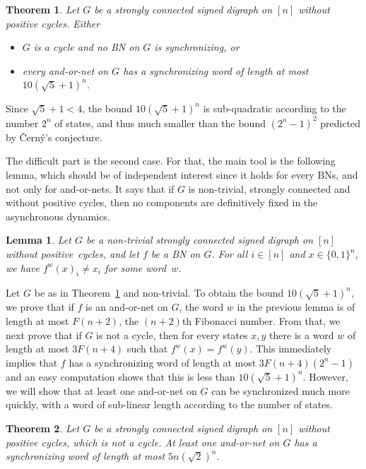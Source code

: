 \documentclass[11pt,letter]{article}
\newtheorem{lemma}{Lemma}
\newtheorem{theorem}{Theorem}
\newcommand{\B}{\{0,1\}}
\begin{document}

\begin{theorem}\label{thm:main}
Let $G$ be a strongly connected signed digraph on $[n]$ without positive cycles. Either
\begin{itemize}
\item $G$ is a cycle and no BN on $G$ is synchronizing, or
\item every and-or-net on $G$ has a synchronizing word of length at most $10(\sqrt{5}+1)^n$.
\end{itemize}
\end{theorem}

Since $\sqrt{5}+1<4$, the bound $10(\sqrt{5}+1)^n$ is sub-quadratic according to the number $2^n$ of states, and thus much smaller than the bound $(2^n-1)^2$ predicted by \v{C}ern\'y's conjecture. 

\medskip
The difficult part is the second case. For that, the main tool is the following lemma, which should be of independent interest since it holds for every BNs, and not only for and-or-nets. It says that if $G$ is non-trivial, strongly connected and without positive cycles, then no components are definitively fixed in the asynchronous dynamics. 

\begin{lemma}\label{lem:flipping_lemma}
Let $G$ be a non-trivial strongly connected signed digraph on $[n]$ without positive~cycles, and let $f$ be a BN on $G$. For all $i\in [n]$ and $x\in\B^n$, we have $f^w(x)_i\neq x_i$ for some word~$w$.
\end{lemma}

Let $G$ be as in Theorem~\ref{thm:main} and non-trivial. To obtain the bound $10(\sqrt{5}+1)^n$, we prove that if $f$ is an and-or-net on $G$, the word $w$ in the previous lemma is of length at most $F(n+2)$, the $(n+2)$th Fibonacci number. From that, we next prove that if $G$ is not a cycle, then for every states $x,y$ there is a word $w$ of length at most $3F(n+4)$ such that $f^w(x)=f^w(y)$. This immediately implies that $f$ has a synchronizing word of length at most $3F(n+4)(2^n-1)$ and an easy computation shows that this is less than $10(\sqrt{5}+1)^n$. However, we will show that at least one and-or-net on $G$ can be synchronized much more quickly, with a word of sub-linear length according to the number of states. 

\begin{theorem}\label{thm:fast}
Let $G$ be a strongly connected signed digraph on $[n]$ without positive cycles, which is not a cycle. At least one and-or-net on $G$ has a synchronizing word of length at most $5n(\sqrt{2})^n$. 
\end{theorem}
\end{document}
